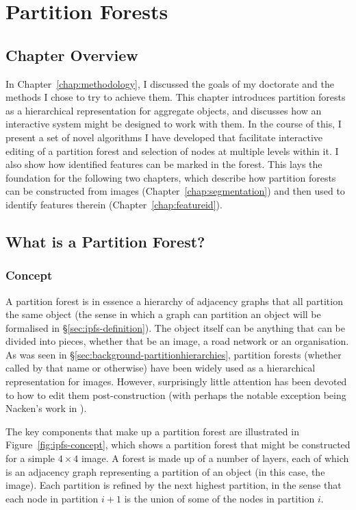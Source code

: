 \chapter{Partition Forests}
\label{chap:ipfs}

\section{Chapter Overview}

In Chapter~\ref{chap:methodology}, I discussed the goals of my doctorate and the methods I chose to try to achieve them. This chapter introduces partition forests as a hierarchical representation for aggregate objects, and discusses how an interactive system might be designed to work with them. In the course of this, I present a set of novel algorithms I have developed that facilitate interactive editing of a partition forest and selection of nodes at multiple levels within it. I also show how identified features can be marked in the forest. This lays the foundation for the following two chapters, which describe how partition forests can be constructed from images (Chapter~\ref{chap:segmentation}) and then used to identify features therein (Chapter~\ref{chap:featureid}).

\section{What is a Partition Forest?}

\subsection{Concept}

A partition forest is in essence a hierarchy of adjacency graphs that all partition the same object (the sense in which a graph can partition an object will be formalised in \S\ref{sec:ipfs-definition}). The object itself can be anything that can be divided into pieces, whether that be an image, a road network or an organisation. As was seen in \S\ref{sec:background-partitionhierarchies}, partition forests (whether called by that name or otherwise) have been widely used as a hierarchical representation for images. However, surprisingly little attention has been devoted to how to edit them post-construction (with perhaps the notable exception being Nacken's work in \cite{nacken95}).

\newpage

The key components that make up a partition forest are illustrated in Figure~\ref{fig:ipfs-concept}, which shows a partition forest that might be constructed for a simple $4 \times 4$ image. A forest is made up of a number of layers, each of which is an adjacency graph representing a partition of an object (in this case, the image). Each partition is refined by the next highest partition, in the sense that each node in partition $i+1$ is the union of some of the nodes in partition $i$.

